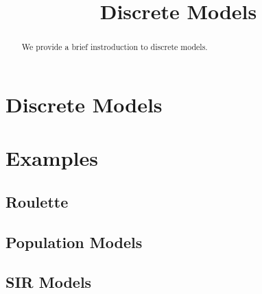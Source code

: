 \documentclass{ximera}
\title{Discrete Models}
\begin{document}
  
\begin{abstract}  
We provide a brief instroduction to discrete models.
\end{abstract}  
\maketitle

\section{Discrete Models}

\section{Examples}

\subsection{Roulette}

\subsection{Population Models}

\subsection{SIR Models}
\end{document}
